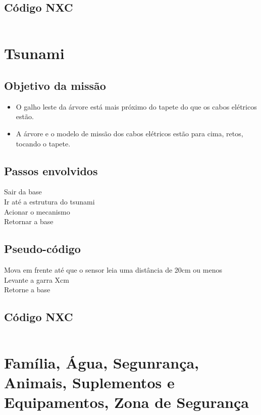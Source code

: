 \documentclass{article}
\begin{document}
	\subsection{Código NXC}
		\inputminted[linenos, frame = single]{c}{../GalhoArvore.nxc}

\newpage
\section{Tsunami}
	\subsection{Objetivo da missão}
		\begin{itemize}
			\item O galho leste da árvore está mais próximo do tapete do que os cabos elétricos estão.
			\item A árvore e o modelo de missão dos cabos elétricos estão para cima, retos, tocando o tapete.
		\end{itemize}

	\subsection{Passos envolvidos}
		Sair da base\\
		Ir até a estrutura do tsunami\\
		Acionar o mecanismo\\
		Retornar a base\\

	\subsection{Pseudo-código}
		Mova em frente até que o sensor leia uma distância de 20cm ou menos\\
		Levante a garra Xcm\\
		Retorne a base\\

	\subsection{Código NXC}
		\inputminted[linenos, frame = single]{c}{../Ondas.nxc}

\newpage
\section{Família, Água, Segunrança, Animais, Suplementos e Equipamentos, Zona de Segurança}
\end{document}

